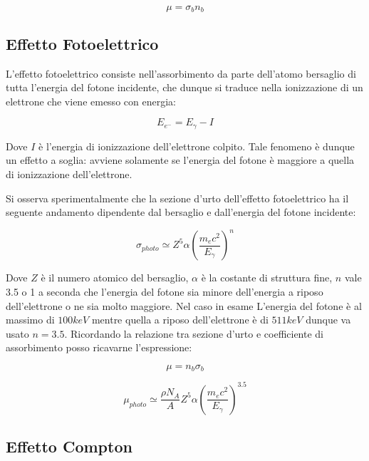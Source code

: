\begin{equation}
\mu=\sigma_{b} n_{b}
\end{equation}

\subsection{Effetto Fotoelettrico}

L'effetto fotoelettrico consiste nell'assorbimento da parte dell'atomo bersaglio di tutta l'energia del fotone incidente, che dunque si traduce nella ionizzazione di un elettrone che viene emesso con energia:

\begin{equation}
E_{e^-}=E_{\gamma}-I
\end{equation}

Dove $I$ è l'energia di ionizzazione dell'elettrone colpito. Tale fenomeno è dunque un effetto a soglia: avviene solamente se l'energia del fotone è maggiore a quella di ionizzazione dell'elettrone.

Si osserva sperimentalmente che la sezione d'urto dell'effetto fotoelettrico ha il seguente andamento dipendente dal bersaglio e dall'energia del fotone incidente:

\begin{equation}
\sigma_{photo}\simeq Z^5\alpha(\frac{m_{e}c^2}{E_{\gamma}})^n
\end{equation}

Dove $Z$ è il numero atomico del bersaglio, $\alpha$ è la costante di struttura fine, $n$ vale 3.5 o 1 a seconda che l'energia del fotone sia minore dell'energia a riposo dell'elettrone o ne sia molto maggiore. Nel caso in esame L'energia del fotone è al massimo di $100 keV$ mentre quella a riposo dell'elettrone è di $511 keV$ dunque va usato $n=3.5$.
Ricordando la relazione tra sezione d'urto e coefficiente di assorbimento posso ricavarne l'espressione:

\begin{equation}
\mu=n_{b}\sigma_{b} 
\end{equation}

\begin{equation}
\mu_{photo}\simeq\frac{\rho N_{A}}{A}Z^5\alpha(\frac{m_{e}c^2}{E_{\gamma}})^{3.5}
\end{equation}

\subsection{Effetto Compton}


